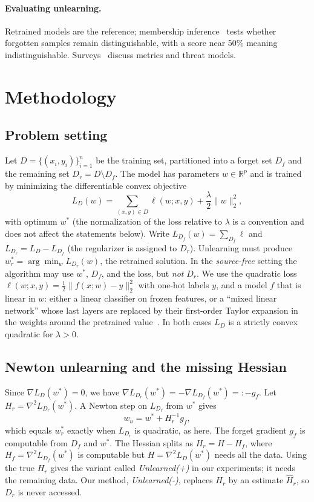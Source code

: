 \documentclass[10pt,twocolumn,letterpaper]{article}
\begin{document}
\paragraph{Evaluating unlearning.}
Retrained models are the reference; membership inference~\cite{shokri2017membership} tests whether forgotten samples remain distinguishable, with a score near 50\% meaning indistinguishable.
Surveys~\cite{xu2023machine} discuss metrics and threat models.

\section{Methodology}
\label{sec:method}
\subsection{Problem setting}
\label{sec:setting}
Let $D=\{(x_i,y_i)\}_{i=1}^n$ be the training set, partitioned into a forget set $D_f$ and the remaining set $D_r=D\setminus D_f$.
The model has parameters $w\in\mathbb{R}^p$ and is trained by minimizing the differentiable convex objective
\begin{equation}
  L_D(w)=\sum_{(x,y)\in D}\ell(w;x,y)+\frac{\lambda}{2}\|w\|_2^2,
  \label{eq:objective}
\end{equation}
with optimum $w^\ast$ (the normalization of the loss relative to $\lambda$ is a convention and does not affect the statements below).
Write $L_{D_f}(w)=\sum_{D_f}\ell$ and $L_{D_r}=L_D-L_{D_f}$ (the regularizer is assigned to $D_r$).
Unlearning must produce $w_r^\ast=\arg\min_w L_{D_r}(w)$, the retrained solution.
In the \emph{source-free} setting the algorithm may use $w^\ast$, $D_f$, and the loss, but \emph{not} $D_r$.
We use the quadratic loss $\ell(w;x,y)=\tfrac12\|f(x;w)-y\|_2^2$ with one-hot labels $y$, and a model $f$ that is linear in $w$: either a linear classifier on frozen features, or a ``mixed linear network'' whose last layers are replaced by their first-order Taylor expansion in the weights around the pretrained value~\cite{lee2019wide,golatkar2021mixed}.
In both cases $L_D$ is a strictly convex quadratic for $\lambda>0$.

\subsection{Newton unlearning and the missing Hessian}
\label{sec:newton}
Since $\nabla L_D(w^\ast)=0$, we have $\nabla L_{D_r}(w^\ast)=-\nabla L_{D_f}(w^\ast)=:-g_f$.
Let $H_r=\nabla^2 L_{D_r}(w^\ast)$. A Newton step on $L_{D_r}$ from $w^\ast$ gives
\begin{equation}
  w_u = w^\ast + H_r^{-1} g_f ,
  \label{eq:newton}
\end{equation}
which equals $w_r^\ast$ exactly when $L_{D_r}$ is quadratic, as here.
The forget gradient $g_f$ is computable from $D_f$ and $w^\ast$.
The Hessian splits as $H_r=H-H_f$, where $H_f=\nabla^2L_{D_f}(w^\ast)$ is computable but $H=\nabla^2L_D(w^\ast)$ needs all the data.
Using the true $H_r$ gives the variant called \emph{Unlearned(+)} in our experiments; it needs the remaining data.
Our method, \emph{Unlearned(-)}, replaces $H_r$ by an estimate $\hat H_r$, so $D_r$ is never accessed.
\end{document}
